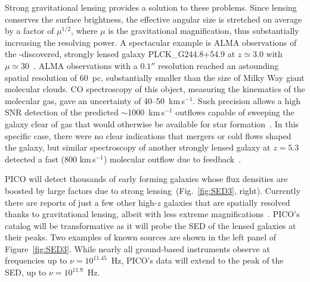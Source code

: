 \documentclass[PICOReport.tex]{subfiles}
\begin{document}
Strong gravitational lensing provides a solution to these problems. Since lensing conserves the surface brightness, the effective angular size is stretched on average by a factor of $\mu^{1/2}$, where $\mu$ is the gravitational magnification, thus substantially increasing the resolving power. A spectacular example is ALMA observations of the \planck-discovered, strongly lensed galaxy PLCK\_G244.8\-+54.9 at $z \simeq 3.0$  with $\mu \simeq 30$~\citep{Canameras2017ALMA}. ALMA observations with a $0.1''$ resolution reached an astounding spatial resolution of 60~pc, substantially smaller than the size of Milky Way giant molecular clouds. CO spectroscopy of this object, measuring the kinematics of the molecular gas, gave an uncertainty of 40--50~km\,s$^{-1}$. Such precision allows a high \ac{SNR} detection of the predicted $\sim$1000~km\,s$^{-1}$ outflows capable of sweeping the galaxy clear of gas that would otherwise be available for star formation~\citep{KingPounds2015}. In this specific case, there were no clear indications that mergers or cold flows shaped the galaxy, but similar spectroscopy of another strongly lensed galaxy at $z=5.3$ detected a fast (800 km\,s$^{-1}$) molecular outflow due to feedback~\citep{spilker2018}. 



PICO will detect thousands of early forming galaxies whose flux densities are boosted by large factors due to strong lensing~(Fig.~\ref{fig:SED3}, right). Currently there are reports of just a few other high-$z$ galaxies that are spatially resolved thanks to gravitational lensing, albeit with less extreme magnifications~\citep{Dye2018, Lamarche2018, Sharda2018}. PICO's catalog will be transformative as it will probe the \ac{SED} of the lensed galaxies at their peaks. Two examples of known sources are shown in the left panel of Figure~\ref{fig:SED3}. While nearly all ground-based instruments observe at frequencies up to $\nu = 10^{11.45}$~Hz, PICO's data will extend to the peak of the \ac{SED}, up to $\nu = 10^{11.9}$~Hz.
\end{document}
